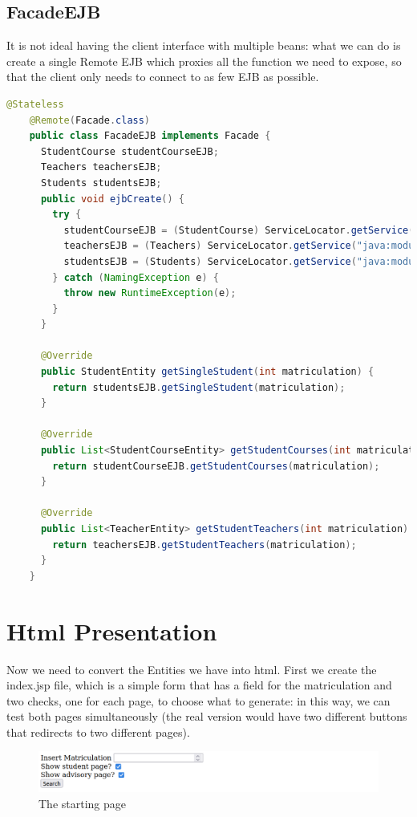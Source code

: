 \documentclass[12pt, a4paper]{article}
\begin{document}
  \subsection{FacadeEJB}
  It is not ideal having the client interface with multiple beans: what we can do is create a single Remote EJB which proxies all the function we need to expose, so that the client only needs to connect to as few EJB as possible.
  \begin{lstlisting}[language=java, caption={FacadeEJB}]
    @Stateless
    @Remote(Facade.class)
    public class FacadeEJB implements Facade {
      StudentCourse studentCourseEJB;
      Teachers teachersEJB;
      Students studentsEJB;
      public void ejbCreate() {
        try {
          studentCourseEJB = (StudentCourse) ServiceLocator.getService("java:module/StudentCourseEJB!it.marrocco.h2ejbdemo.ejb.StudentCourse");
          teachersEJB = (Teachers) ServiceLocator.getService("java:module/TeachersEJB!it.marrocco.h2ejbdemo.ejb.Teachers");
          studentsEJB = (Students) ServiceLocator.getService("java:module/StudentsEJB!it.marrocco.h2ejbdemo.ejb.Students");
        } catch (NamingException e) {
          throw new RuntimeException(e);
        }
      }
  
      @Override
      public StudentEntity getSingleStudent(int matriculation) {
        return studentsEJB.getSingleStudent(matriculation);
      }
  
      @Override
      public List<StudentCourseEntity> getStudentCourses(int matriculation) {
        return studentCourseEJB.getStudentCourses(matriculation);
      }
  
      @Override
      public List<TeacherEntity> getStudentTeachers(int matriculation) {
        return teachersEJB.getStudentTeachers(matriculation);
      }
    }
  \end{lstlisting}

  \pagebreak
  \section{Html Presentation}
  Now we need to convert the Entities we have into html.
  First we create the index.jsp file, which is a simple form that has a field for the matriculation and two checks, one for each page, to choose what to generate: in this way, we can test both pages simultaneously (the real version would have two different buttons that redirects to two different pages).

  \begin{figure}[H]
    \centering
    \includegraphics[width=\columnwidth]{index.png}
    \caption{The starting page}
  \end{figure}
\end{document}
